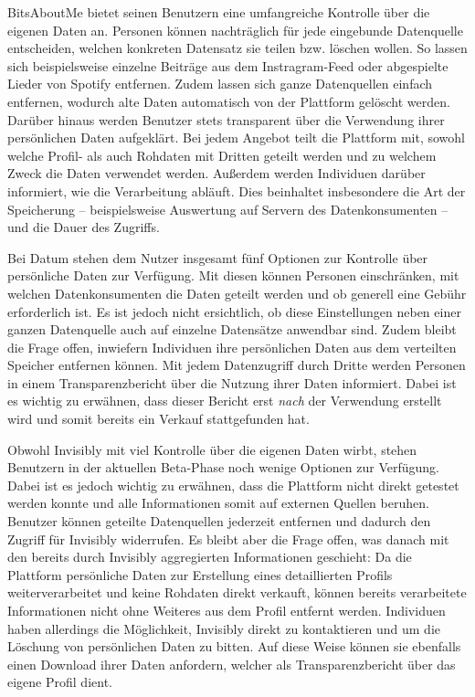 \noindent BitsAboutMe bietet seinen Benutzern eine umfangreiche Kontrolle über die eigenen Daten an. Personen können nachträglich für jede eingebunde Datenquelle entscheiden, welchen konkreten Datensatz sie teilen bzw. löschen wollen. So lassen sich beispielsweise einzelne Beiträge aus dem Instragram-Feed oder abgespielte Lieder von Spotify entfernen. Zudem lassen sich ganze Datenquellen einfach entfernen, wodurch alte Daten automatisch von der Plattform gelöscht werden. Darüber hinaus werden Benutzer stets transparent über die Verwendung ihrer persönlichen Daten aufgeklärt. Bei jedem Angebot teilt die Plattform mit, sowohl welche Profil- als auch Rohdaten mit Dritten geteilt werden und zu welchem Zweck die Daten verwendet werden. Außerdem werden Individuen darüber informiert, wie die Verarbeitung abläuft. Dies beinhaltet insbesondere die Art der Speicherung -- beispielsweise Auswertung auf Servern des Datenkonsumenten -- und die Dauer des Zugriffs. \newline

\noindent Bei Datum stehen dem Nutzer insgesamt fünf Optionen zur Kontrolle über persönliche Daten zur Verfügung. Mit diesen können Personen einschränken, mit welchen Datenkonsumenten die Daten geteilt werden und ob generell eine Gebühr erforderlich ist. Es ist jedoch nicht ersichtlich, ob diese Einstellungen neben einer ganzen Datenquelle auch auf einzelne Datensätze anwendbar sind. Zudem bleibt die Frage offen, inwiefern Individuen ihre persönlichen Daten aus dem verteilten Speicher entfernen können. Mit jedem Datenzugriff durch Dritte werden Personen in einem Transparenzbericht über die Nutzung ihrer Daten informiert. Dabei ist es wichtig zu erwähnen, dass dieser Bericht erst \textit{nach} der Verwendung erstellt wird und somit bereits ein Verkauf stattgefunden hat. \newline

\noindent Obwohl Invisibly mit viel Kontrolle über die eigenen Daten wirbt, stehen Benutzern in der aktuellen Beta-Phase noch wenige Optionen zur Verfügung. Dabei ist es jedoch wichtig zu erwähnen, dass die Plattform nicht direkt getestet werden konnte und alle Informationen somit auf externen Quellen beruhen. Benutzer können geteilte Datenquellen jederzeit entfernen und dadurch den Zugriff für Invisibly widerrufen. Es bleibt aber die Frage offen, was danach mit den bereits durch Invisibly aggregierten Informationen geschieht: Da die Plattform persönliche Daten zur Erstellung eines detaillierten Profils weiterverarbeitet und keine Rohdaten direkt verkauft, können bereits verarbeitete Informationen nicht ohne Weiteres aus dem Profil entfernt werden. Individuen haben allerdings die Möglichkeit, Invisibly direkt zu kontaktieren und um die Löschung von persönlichen Daten zu bitten. Auf diese Weise können sie ebenfalls einen Download ihrer Daten anfordern, welcher als Transparenzbericht über das eigene Profil dient. \newline

